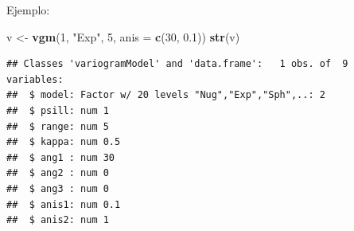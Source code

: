 \documentclass[
]{book}
\newenvironment{Shaded}{\begin{snugshade}}{\end{snugshade}}
\newcommand{\AttributeTok}[1]{\textcolor[rgb]{0.13,0.29,0.53}{#1}}
\newcommand{\DecValTok}[1]{\textcolor[rgb]{0.00,0.00,0.81}{#1}}
\newcommand{\FloatTok}[1]{\textcolor[rgb]{0.00,0.00,0.81}{#1}}
\newcommand{\FunctionTok}[1]{\textcolor[rgb]{0.13,0.29,0.53}{\textbf{#1}}}
\newcommand{\NormalTok}[1]{#1}
\newcommand{\OtherTok}[1]{\textcolor[rgb]{0.56,0.35,0.01}{#1}}
\newcommand{\StringTok}[1]{\textcolor[rgb]{0.31,0.60,0.02}{#1}}
\theoremstyle{break}
\theoremstyle{definition}
\theoremstyle{definition}
\theoremstyle{definition}
\theoremstyle{definition}
\theoremstyle{remark}
\begin{document}
Ejemplo:

\begin{Shaded}
\begin{Highlighting}[]
\NormalTok{v }\OtherTok{\textless{}{-}} \FunctionTok{vgm}\NormalTok{(}\DecValTok{1}\NormalTok{, }\StringTok{"Exp"}\NormalTok{, }\DecValTok{5}\NormalTok{, }\AttributeTok{anis =} \FunctionTok{c}\NormalTok{(}\DecValTok{30}\NormalTok{, }\FloatTok{0.1}\NormalTok{))}
\FunctionTok{str}\NormalTok{(v)}
\end{Highlighting}
\end{Shaded}

\begin{verbatim}
## Classes 'variogramModel' and 'data.frame':   1 obs. of  9 variables:
##  $ model: Factor w/ 20 levels "Nug","Exp","Sph",..: 2
##  $ psill: num 1
##  $ range: num 5
##  $ kappa: num 0.5
##  $ ang1 : num 30
##  $ ang2 : num 0
##  $ ang3 : num 0
##  $ anis1: num 0.1
##  $ anis2: num 1
\end{verbatim}
\end{document}
